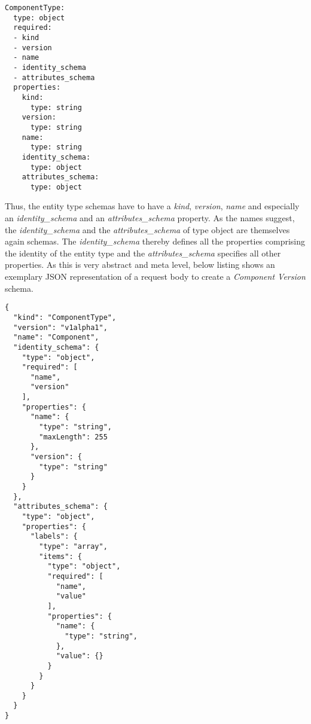 \begin{lstlisting}[basicstyle=\tiny, caption=Entity Type Schema Schema, captionpos=b, label=lst:EntityTypeSchemaSchema]
ComponentType:
  type: object
  required:
  - kind
  - version
  - name
  - identity_schema
  - attributes_schema
  properties:
    kind: 
      type: string
    version:
      type: string
    name:
      type: string
    identity_schema:
      type: object
    attributes_schema:
      type: object
\end{lstlisting}

Thus, the entity type schemas have to have a \emph{kind}, \emph{version}, \emph{name} and especially an \emph{identity\_schema} and an \emph{attributes\_schema} property. As the names suggest, the \emph{identity\_schema} and the \emph{attributes\_schema} of type object are themselves again schemas. The \emph{identity\_schema} thereby defines all the properties comprising the identity of the entity type and the \emph{attributes\_schema} specifies all other properties. As this is very abstract and meta level, below listing shows an exemplary JSON representation of a request body to create a \emph{Component Version} schema. 

\begin{lstlisting}[basicstyle=\tiny, caption=Request Body for Component Version Schema Creation, captionpos=b, label=lst:ComponentVersionSchemaCreation]
{
  "kind": "ComponentType",
  "version": "v1alpha1",
  "name": "Component",
  "identity_schema": {
    "type": "object",
    "required": [
      "name",
      "version"
    ],
    "properties": {
      "name": {
        "type": "string",
        "maxLength": 255
      },
      "version": {
        "type": "string"
      }
    }
  },
  "attributes_schema": {
    "type": "object",
    "properties": {
      "labels": {
        "type": "array",
        "items": {
          "type": "object",
          "required": [
            "name",
            "value"
          ],
          "properties": {
            "name": {
              "type": "string",
            },
            "value": {}
          }
        }  
      }
    }
  }
}
\end{lstlisting}

